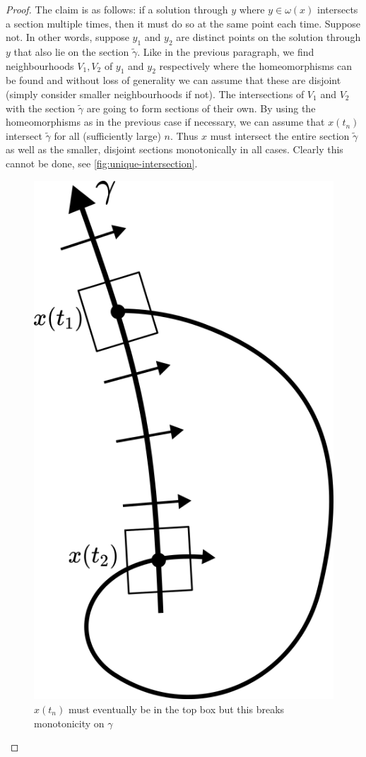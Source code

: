 \begin{proof}
The claim is as follows: if a solution through $y$ where $y \in \omega(x)$ intersects a section multiple times, then it must do so at the same point each time. Suppose not. In other words, suppose $y_1$ and $y_2$ are distinct points on the solution through $y$ that also lie on the section $\tilde{\gamma}$. Like in the previous paragraph, we find neighbourhoods $V_1, V_2$ of $y_1$ and $y_2$ respectively where the homeomorphisms can be found and without loss of generality we can assume that these are disjoint (simply consider smaller neighbourhoods if not). The intersections of $V_1$ and $V_2$ with the section $\tilde{\gamma}$ are going to form sections of their own. By using the homeomorphisms as in the previous case if necessary, we can assume that $x(t_n)$ intersect $\tilde{\gamma}$ for all (sufficiently large) $n$. Thus $x$ must intersect the entire section $\tilde{\gamma}$ as well as the smaller, disjoint sections monotonically in all cases. Clearly this cannot be done, see \autoref{fig:unique-intersection}.

\begin{figure}[ht]
    \centering
    \includegraphics[scale=0.4]{Images/unique_intersection.png}
    \caption{$x(t_n)$ must eventually be in the top box but this breaks monotonicity on $\gamma$}
    \label{fig:unique-intersection}
\end{figure}


\end{proof}
